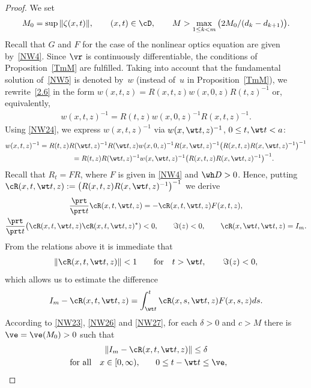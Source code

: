 \begin{proof} We set
\begin{gather} \label{NW23}
M_0=\sup\| \zeta(x,t)\|, \qquad (x,t)\in \cD, \qquad M>\max_{1\leq k<m}\big(2M_0/(d_k-d_{k+1})\big).
\end{gather}
Recall that $G$ and $F$ for the case of the nonlinear optics equation are given by~\eqref{NW4}. Since $\vr$ is continuously dif\/ferentiable, the conditions of Proposition~\ref{TmM}
are fulf\/illed. Taking into account that the fundamental solution of~\eqref{NW5} is denoted by~$w$
(instead of~$u$ in Proposition~\ref{TmM}), we rewrite~\eqref{2.6} in the form
$w(x,t,z)=R(x,t,z)w(x,0,z)R(t,z)^{-1}$ or, equivalently,
\begin{gather} \label{NW24}
w(x,t,z)^{-1}=R(t,z)w(x,0,z)^{-1}R(x,t,z)^{-1}.
\end{gather}
Using \eqref{NW24}, we express $w(x,t,z)^{-1}$ via $w(x,\wt t,z)^{-1}$, $0 \leq t,\wt t <a$:
\begin{gather}
w(x,t,z)^{-1} =R(t,z)R(\wt t,z)^{-1}R(\wt t,z)w(x,0,z)^{-1}R(x,\wt t,z)^{-1}\big(R(x,t,z)R(x,\wt t,z)^{-1}\big)^{-1}\nonumber\\
 \label{NW25}
 \hphantom{w(x,t,z)^{-1}}{}
 =R(t,z)R(\wt t,z)^{-1}w(x,\wt t,z)^{-1}\big(R(x,t,z)R(x,\wt t,z)^{-1}\big)^{-1}.
\end{gather}
Recall that $R_t=FR$, where $F$ is given in \eqref{NW4} and $\wh D>0$. Hence, putting $\cR(x,t, \wt t, z):=\big(R(x,t,z)R(x,\wt t,z)^{-1}\big)^{-1}$ we derive
\begin{gather*}
\frac{\prt}{\prt t} \cR(x,t, \wt t, z)=-\cR(x,t, \wt t, z)F(x,t,z), \\
\frac{\prt}{\prt t} \big(\cR(x,t, \wt t, z)\cR(x,t, \wt t, z)^*)<0, \qquad \Im(z)<0 , \qquad
 \cR(x,\wt t, \wt t, z)=I_m.
\end{gather*}
From the relations above it is immediate that
\begin{gather} \label{NW26}
\|\cR(x, t, \wt t, z)\|<1 \qquad {\mathrm{for}}\quad t>\wt t, \qquad \Im(z)<0,
\end{gather}
which allows us to estimate the dif\/ference
\begin{gather} \label{NW27}
I_m-\cR(x, t, \wt t, z)=\int_{\wt t}^t \cR(x, s, \wt t, z)F(x,s,z)ds.
\end{gather}
According to \eqref{NW23}, \eqref{NW26} and \eqref{NW27}, for each $\delta >0$ and $c>M$ there is $\ve=\ve(M_0)>0$ such that
\begin{gather} \label{NW28}
\| I_m-\cR(x, t, \wt t, z)\| \leq \delta
\\ \nonumber \text{for all} \quad x\in [0, \infty), \qquad \! 0\leq t-\wt t \leq \ve,\qquad\!

\end{gather}
\end{proof}
